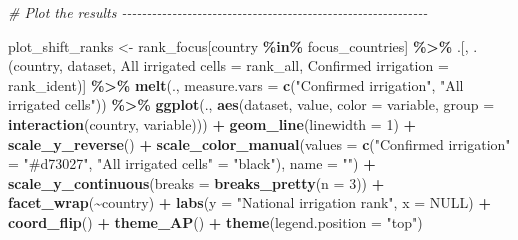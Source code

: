 \documentclass[
  11pt,
]{article}
\newenvironment{Shaded}{\begin{snugshade}}{\end{snugshade}}
\newcommand{\AttributeTok}[1]{\textcolor[rgb]{0.13,0.29,0.53}{#1}}
\newcommand{\CommentTok}[1]{\textcolor[rgb]{0.56,0.35,0.01}{\textit{#1}}}
\newcommand{\ConstantTok}[1]{\textcolor[rgb]{0.56,0.35,0.01}{#1}}
\newcommand{\DecValTok}[1]{\textcolor[rgb]{0.00,0.00,0.81}{#1}}
\newcommand{\FunctionTok}[1]{\textcolor[rgb]{0.13,0.29,0.53}{\textbf{#1}}}
\newcommand{\NormalTok}[1]{#1}
\newcommand{\OtherTok}[1]{\textcolor[rgb]{0.56,0.35,0.01}{#1}}
\newcommand{\SpecialCharTok}[1]{\textcolor[rgb]{0.81,0.36,0.00}{\textbf{#1}}}
\newcommand{\StringTok}[1]{\textcolor[rgb]{0.31,0.60,0.02}{#1}}
\begin{document}
\begin{Shaded}
\begin{Highlighting}[]
\CommentTok{\# Plot the results {-}{-}{-}{-}{-}{-}{-}{-}{-}{-}{-}{-}{-}{-}{-}{-}{-}{-}{-}{-}{-}{-}{-}{-}{-}{-}{-}{-}{-}{-}{-}{-}{-}{-}{-}{-}{-}{-}{-}{-}{-}{-}{-}{-}{-}{-}{-}{-}{-}{-}{-}{-}{-}{-}{-}{-}{-}{-}{-}{-}{-}}

\NormalTok{plot\_shift\_ranks }\OtherTok{\textless{}{-}}\NormalTok{ rank\_focus[country }\SpecialCharTok{\%in\%}\NormalTok{ focus\_countries] }\SpecialCharTok{\%\textgreater{}\%}
\NormalTok{  .[, .(country, dataset,}
        \StringTok{\textasciigrave{}}\AttributeTok{All irrigated cells}\StringTok{\textasciigrave{}} \OtherTok{=}\NormalTok{ rank\_all,}
        \StringTok{\textasciigrave{}}\AttributeTok{Confirmed irrigation}\StringTok{\textasciigrave{}} \OtherTok{=}\NormalTok{ rank\_ident)] }\SpecialCharTok{\%\textgreater{}\%}
  \FunctionTok{melt}\NormalTok{(., }\AttributeTok{measure.vars =} \FunctionTok{c}\NormalTok{(}\StringTok{"Confirmed irrigation"}\NormalTok{, }\StringTok{"All irrigated cells"}\NormalTok{)) }\SpecialCharTok{\%\textgreater{}\%}
  \FunctionTok{ggplot}\NormalTok{(., }\FunctionTok{aes}\NormalTok{(dataset, value, }\AttributeTok{color =}\NormalTok{ variable,}
                \AttributeTok{group =} \FunctionTok{interaction}\NormalTok{(country, variable))) }\SpecialCharTok{+}
  \FunctionTok{geom\_line}\NormalTok{(}\AttributeTok{linewidth =} \DecValTok{1}\NormalTok{) }\SpecialCharTok{+}
  \FunctionTok{scale\_y\_reverse}\NormalTok{() }\SpecialCharTok{+}
  \FunctionTok{scale\_color\_manual}\NormalTok{(}\AttributeTok{values =} \FunctionTok{c}\NormalTok{(}\StringTok{"Confirmed irrigation"} \OtherTok{=} \StringTok{"\#d73027"}\NormalTok{,}
                                \StringTok{"All irrigated cells"} \OtherTok{=} \StringTok{"black"}\NormalTok{),}
                     \AttributeTok{name =} \StringTok{""}\NormalTok{) }\SpecialCharTok{+}
  \FunctionTok{scale\_y\_continuous}\NormalTok{(}\AttributeTok{breaks =} \FunctionTok{breaks\_pretty}\NormalTok{(}\AttributeTok{n =} \DecValTok{3}\NormalTok{)) }\SpecialCharTok{+}
  \FunctionTok{facet\_wrap}\NormalTok{(}\SpecialCharTok{\textasciitilde{}}\NormalTok{country) }\SpecialCharTok{+}
  \FunctionTok{labs}\NormalTok{(}\AttributeTok{y =} \StringTok{"National irrigation rank"}\NormalTok{, }\AttributeTok{x =} \ConstantTok{NULL}\NormalTok{) }\SpecialCharTok{+}
  \FunctionTok{coord\_flip}\NormalTok{() }\SpecialCharTok{+}
  \FunctionTok{theme\_AP}\NormalTok{() }\SpecialCharTok{+}
  \FunctionTok{theme}\NormalTok{(}\AttributeTok{legend.position =} \StringTok{"top"}\NormalTok{)}
\end{Highlighting}
\end{Shaded}
\end{document}

